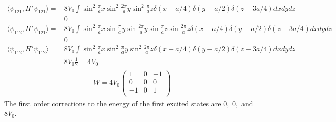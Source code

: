 \begin{align*}
    \langle\psi_{121}, H'\psi_{121}\rangle
    =&8V_0
    \int 
    \sin^2\frac{\pi}{a}x
    \sin^2\frac{2\pi}{a}y
    \sin^2\frac{\pi}{a}z
    \delta(x-a/4)
    \delta(y-a/2)
    \delta(z-3a/4)dxdydz\\
    =&0
\end{align*}
\begin{align*}
    \langle\psi_{112}, H'\psi_{121}\rangle
    =&8V_0
    \int 
    \sin^2\frac{\pi}{a}x
    \sin\frac{\pi}{a}y
    \sin\frac{2\pi}{a}y
    \sin\frac{\pi}{a}z
    \sin\frac{2\pi}{a}z
    \delta(x-a/4)
    \delta(y-a/2)
    \delta(z-3a/4)dxdydz\\
    =&0
\end{align*}
\begin{align*}
    \langle\psi_{112}, H'\psi_{112}\rangle
    =&8V_0
    \int 
    \sin^2\frac{\pi}{a}x
    \sin^2\frac{\pi}{a}y
    \sin^2\frac{2\pi}{a}z
    \delta(x-a/4)
    \delta(y-a/2)
    \delta(z-3a/4)dxdydz\\
    =&8V_0\frac{1}{2} = 4V_0
\end{align*}
\begin{align*}
    W = 
    4V_0
    \begin{pmatrix}
        1 & 0 & -1\\
        0 & 0 & 0 \\
        -1 & 0 & 1 \\
    \end{pmatrix}
\end{align*}
The first order corrections to the energy of the first excited states are $0,$ $0,$ and $8V_0.$


